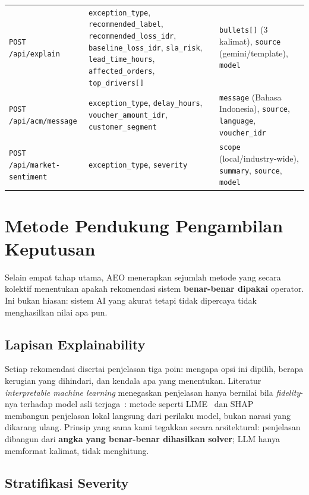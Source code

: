 \documentclass[12pt,a4paper]{article}
\begin{document}
\begin{longtable}{>{\raggedright\arraybackslash}p{3.5cm}
                  >{\raggedright\arraybackslash}p{5.6cm}
                  >{\raggedright\arraybackslash}p{5.0cm}}
  \texttt{POST /api/explain}
    & \texttt{exception\_type}, \texttt{recommended\_label}, \texttt{recommended\_loss\_idr}, \texttt{baseline\_loss\_idr}, \texttt{sla\_risk}, \texttt{lead\_time\_hours}, \texttt{affected\_orders}, \texttt{top\_drivers[]}
    & \texttt{bullets[]} (3 kalimat), \texttt{source} (gemini/template), \texttt{model} \\[4pt]
  \texttt{POST /api/acm/message}
    & \texttt{exception\_type}, \texttt{delay\_hours}, \texttt{voucher\_amount\_idr}, \texttt{customer\_segment}
    & \texttt{message} (Bahasa Indonesia), \texttt{source}, \texttt{language}, \texttt{voucher\_idr} \\[4pt]
  \texttt{POST /api/market-sentiment}
    & \texttt{exception\_type}, \texttt{severity}
    & \texttt{scope} (local/industry-wide), \texttt{summary}, \texttt{source}, \texttt{model} \\
\end{longtable}
\normalsize

\section{Metode Pendukung Pengambilan Keputusan}

Selain empat tahap utama, AEO menerapkan sejumlah metode yang secara kolektif menentukan apakah rekomendasi sistem \textbf{benar-benar dipakai} operator. Ini bukan hiasan: sistem AI yang akurat tetapi tidak dipercaya tidak menghasilkan nilai apa pun.

\subsection{Lapisan Explainability}

Setiap rekomendasi disertai penjelasan tiga poin: mengapa opsi ini dipilih, berapa kerugian yang dihindari, dan kendala apa yang menentukan. Literatur \textit{interpretable machine learning} menegaskan penjelasan hanya bernilai bila \textit{fidelity}-nya terhadap model asli terjaga~\cite{doshivelez}: metode seperti LIME~\cite{lime} dan SHAP~\cite{shap} membangun penjelasan lokal langsung dari perilaku model, bukan narasi yang dikarang ulang. Prinsip yang sama kami tegakkan secara arsitektural: penjelasan dibangun dari \textbf{angka yang benar-benar dihasilkan solver}; LLM hanya memformat kalimat, tidak menghitung.

\subsection{Stratifikasi Severity}
\end{document}
